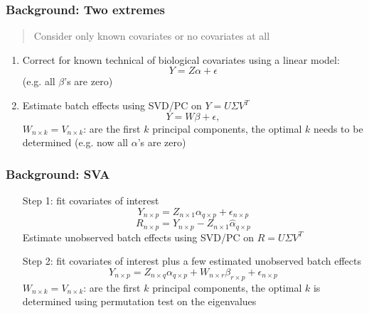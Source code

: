 \documentclass{beamer}
\begin{document}
\begin{frame}
  \frametitle{Background: Two extremes}
  \begin{quote}
    Consider only known covariates or no covariates at all
  \end{quote}
  \begin{enumerate}
  \item Correct for known technical of biological covariates using a linear model:\\
    \begin{equation}
      \label{eq:linmod}
      Y = Z\alpha + \epsilon
    \end{equation}
    (e.g. all $\beta$'s are zero)
  \item Estimate batch effects using SVD/PC on $Y = U \Sigma V^T$ \\
    \begin{equation}
      \label{eq:svd}
      Y = W\beta + \epsilon,
    \end{equation}
    $W_{n \times k} = V_{n \times k}$: are the first $k$ principal components, the optimal $k$ needs to be determined (e.g. now all $\alpha$'s are zero)
  \end{enumerate}
\end{frame}

\begin{frame}
  \frametitle{Background: SVA}
  \begin{enumerate}
  \item[Step 1:] fit covariates of interest
    \begin{equation}
      \label{eq:sva1a}
      Y_{n \times p} = Z_{n \times 1}\alpha_{q \times p} + \epsilon_{n \times p}
    \end{equation}
    \begin{equation}
      \label{eq:sva1b}
      R_{n \times p} = Y_{n \times p} - Z_{n \times 1}\hat{\alpha}_{q \times p}
    \end{equation}
    Estimate unobserved batch effects using SVD/PC on $R = U \Sigma V^T$
  \item[Step 2:]  fit covariates of interest plus a few estimated unobserved batch effects
    \begin{equation}
      \label{eq:svafit}
      Y_{n \times p} = Z_{n \times q}\alpha_{q \times p} + W_{n \times r}\beta_{r \times p} + \epsilon_{n \times p}
    \end{equation}
    $W_{n \times k} = V_{n \times k}$: are the first $k$ principal components, the optimal $k$ is determined using permutation test on the eigenvalues\\
  \end{enumerate}
\end{frame}
\end{document}
